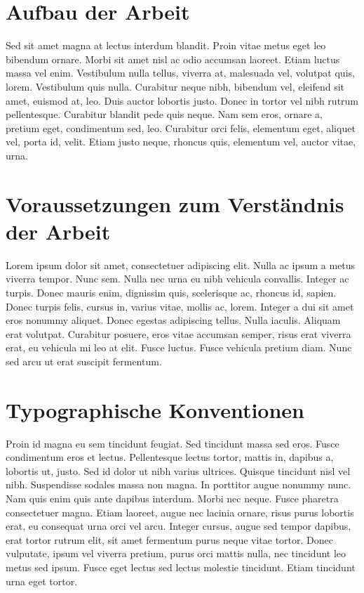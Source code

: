 \section{Aufbau der Arbeit}
Sed sit amet magna at lectus interdum blandit. Proin vitae metus eget leo bibendum ornare. Morbi sit amet nisl ac odio accumsan laoreet. Etiam luctus massa vel enim. Vestibulum nulla tellus, viverra at, malesuada vel, volutpat quis, lorem. Vestibulum quis nulla. Curabitur neque nibh, bibendum vel, eleifend sit amet, euismod at, leo. Duis auctor lobortis justo. Donec in tortor vel nibh rutrum pellentesque. Curabitur blandit pede quis neque. Nam sem eros, ornare a, pretium eget, condimentum sed, leo. Curabitur orci felis, elementum eget, aliquet vel, porta id, velit. Etiam justo neque, rhoncus quis, elementum vel, auctor vitae, urna.

\section{Voraussetzungen zum Verständnis der Arbeit}
Lorem ipsum dolor sit amet, consectetuer adipiscing elit. Nulla ac ipsum a metus viverra tempor. Nunc sem. Nulla nec urna eu nibh vehicula convallis. Integer ac turpis. Donec mauris enim, dignissim quis, scelerisque ac, rhoncus id, sapien. Donec turpis felis, cursus in, varius vitae, mollis ac, lorem. Integer a dui sit amet eros nonummy aliquet. Donec egestas adipiscing tellus. Nulla iaculis. Aliquam erat volutpat. Curabitur posuere, eros vitae accumsan semper, risus erat viverra erat, eu vehicula mi leo at elit. Fusce luctus. Fusce vehicula pretium diam. Nunc sed arcu ut erat suscipit fermentum.

\section{Typographische Konventionen}
Proin id magna eu sem tincidunt feugiat. Sed tincidunt massa sed eros. Fusce condimentum eros et lectus. Pellentesque lectus tortor, mattis in, dapibus a, lobortis ut, justo. Sed id dolor ut nibh varius ultrices. Quisque tincidunt nisl vel nibh. Suspendisse sodales massa non magna. In porttitor augue nonummy nunc. Nam quis enim quis ante dapibus interdum. Morbi nec neque. Fusce pharetra consectetuer magna. Etiam laoreet, augue nec lacinia ornare, risus purus lobortis erat, eu consequat urna orci vel arcu. Integer cursus, augue sed tempor dapibus, erat tortor rutrum elit, sit amet fermentum purus neque vitae tortor. Donec vulputate, ipsum vel viverra pretium, purus orci mattis nulla, nec tincidunt leo metus sed ipsum. Fusce eget lectus sed lectus molestie tincidunt. Etiam tincidunt urna eget tortor.

